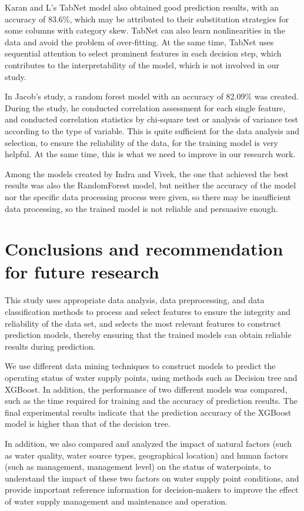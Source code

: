 \documentclass[conference]{IEEEtran}
\begin{document}
Karan and L's TabNet model also obtained good prediction results, with an accuracy of 83.6\%, which may be attributed to their substitution strategies for some columns with category skew. TabNet can also learn nonlinearities in the data and avoid the problem of over-fitting. At the same time, TabNet uses sequential attention to select prominent features in each decision step, which contributes to the interpretability of the model, which is not involved in our study\cite{b2}.

In Jacob's study, a random forest model with an accuracy of 82.09\% was created. During the study, he conducted correlation assessment for each single feature, and conducted correlation statistics by chi-square test or analysis of variance test according to the type of variable. This is quite sufficient for the data analysis and selection, to ensure the reliability of the data, for the training model is very helpful. At the same time, this is what we need to improve in our research work\cite{b3}.

Among the models created by Indra and Vivek, the one that achieved the best results was also the RandomForest model, but neither the accuracy of the model nor the specific data processing process were given, so there may be insufficient data processing, so the trained model is not reliable and persuasive enough\cite{b4}.

\section{Conclusions and recommendation for future research}

This study uses appropriate data analysis, data preprocessing, and data classification methods to process and select features to ensure the integrity and reliability of the data set, and selects the most relevant features to construct prediction models, thereby ensuring that the trained models can obtain reliable results during prediction.

We use different data mining techniques to construct models to predict the operating status of water supply points, using methods such as Decision tree and XGBoost. In addition, the performance of two different models was compared, such as the time required for training and the accuracy of prediction results. The final experimental results indicate that the prediction accuracy of the XGBoost model is higher than that of the decision tree.

In addition, we also compared and analyzed the impact of natural factors (such as water quality, water source types, geographical location) and human factors (such as management, management level) on the status of waterpoints, to understand the impact of these two factors on water supply point conditions, and provide important reference information for decision-makers to improve the effect of water supply management and maintenance and operation.
\end{document}
